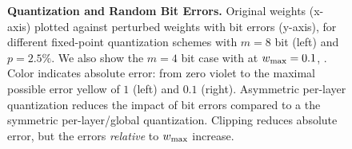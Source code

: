 \begin{figure}[t]
	\vspace*{-6px}
	\caption{\textbf{Quantization and Random Bit Errors.} Original weights (x-axis) plotted against perturbed weights with bit errors (y-axis), for different %
	fixed-point quantization schemes with $m = 8$ bit (left) and $p=2.5\%$. We also show the $m = 4$ bit case with \Clipping at $\wmax = 0.1$, \cf {}. Color indicates absolute error: from zero {\color{violet}violet} to the maximal possible error {\color{yellow!75!black}yellow} of $1$ (left) and $0.1$ (right). Asymmetric per-layer quantization reduces the impact of bit errors compared to a the symmetric per-layer/global quantization. Clipping reduces absolute error, but the errors \emph{relative} to $\wmax$ increase.}
	\label{fig:quantization}
	\vspace*{-0.2cm}
\end{figure}